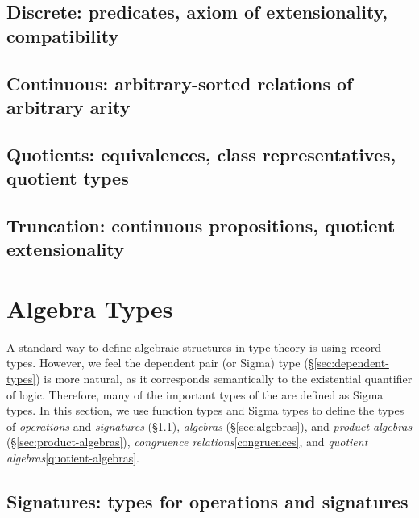 \documentclass[a4paper,UKenglish,cleveref,autoref,thm-restate,12pt]{../lipics-v2021-wjd}
\begin{document}
\subsection{Discrete: predicates, axiom of extensionality, compatibility}\label{sec:discrete-relations}


\subsection{Continuous: arbitrary-sorted relations of arbitrary arity}\label{sec:continuous-relations}


\subsection{Quotients: equivalences, class representatives, quotient types}\label{sec:equiv-relat-quot}


\subsection{Truncation: continuous propositions, quotient extensionality}\label{sec:trunc-sets-prop}


\section{Algebra Types}\label{sec:algebra-types}
A standard way to define algebraic structures in type theory is using record types.  However, we feel the dependent pair (or Sigma) type (\S\ref{sec:dependent-types}) is more natural, as it corresponds semantically to the existential quantifier of logic. Therefore, many of the important types of the \ualib are defined as Sigma types. In this section, we use function types and Sigma types to define the types of \emph{operations} and \emph{signatures} (\S\ref{sec:oper-sign}), \emph{algebras} (\S\ref{sec:algebras}), and \emph{product algebras} (\S\ref{sec:product-algebras}), \emph{congruence relations}\ref{congruences}, and \emph{quotient algebras}\ref{quotient-algebras}.

\subsection{Signatures: types for operations and signatures}\label{sec:oper-sign}

\end{document}

